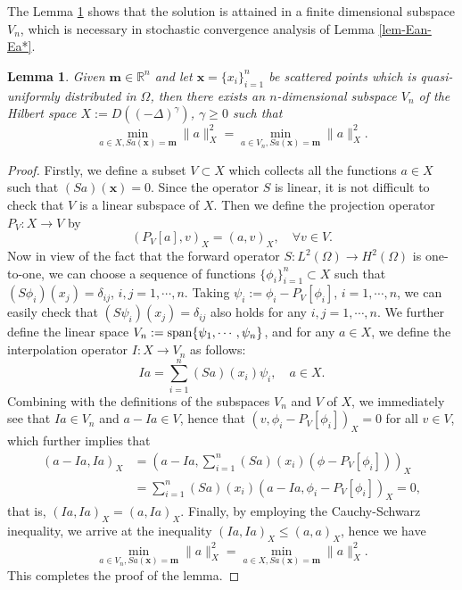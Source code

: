 \documentclass[11pt]{article}
\newtheorem{lemma}{Lemma}[section]
\numberwithin{equation}{section}
\begin{document}
The Lemma \ref{lem-Vn} shows that the solution is attained in a
finite dimensional subspace $V_n$, which is necessary in stochastic convergence analysis of Lemma \ref{lem-Ean-Ea*}.
\begin{lemma}\label{lem-Vn}
Given $\mathbf{m}\in \mathbb R^n$ and let $\mathbf{x}=\{x_i\}_{i=1}^n$ be scattered points which is quasi-uniformly distributed in $\Omega$, then there exists an $n$-dimensional subspace $V_n$ of the Hilbert space $X:=D((-\Delta)^\gamma)$, $\gamma\ge0$ such that
$$
\min_{a\in X, Sa(\mathbf{x})=\mathbf{m}} \|a\|_{X}^2 = \min_{a\in V_n, Sa(\mathbf{x})=\mathbf{m}} \|a\|_{X}^2.
$$
\end{lemma}
\begin{proof}
Firstly, we define a subset $V\subset X$ which collects all the functions $a\in X$ such that $(Sa)(\mathbf x)=0$. Since the operator $S$ is linear, it is not difficult to check that $V$ is a linear subspace of $X$. Then we define the projection operator $P_V:X\to V$ by
$$
 (P_V[a], v)_{X} = (a,v)_{X},\quad \forall v\in V.
$$
Now in view of the fact that the forward operator $S:L^2(\Omega) \to H^2(\Omega)$ is one-to-one, we can choose a sequence of functions $\{\phi_i\}_{i=1}^n\subset X$ such that $(S\phi_i)(x_j)= \delta_{ij}$, $i,j=1,\cdots,n$. Taking $\psi_i := \phi_i - P_V[\phi_i]$, $i=1,\cdots,n$, we can easily check that $(S\psi_i)(x_j)= \delta_{ij}$ also holds for any $i,j=1,\cdots,n$. We further define the linear space $V_n := {\rm span} \{\psi_1,\cdots,\psi_n\}$, and for any $a\in X$, we define the interpolation operator $I: X\to V_n$ as follows:
$$
Ia= \sum_{i=1}^n (Sa)(x_i)\psi_i,\quad a\in X.
$$
Combining with the definitions of the subspaces $V_n$ and $V$ of $X$, we immediately see that $Ia\in V_n$ and $a-Ia\in V$, hence that $(v,\phi_i - P_V[\phi_i])_{X} = 0$ for all $v\in V$, which further implies that
$$
\begin{aligned}
(a-Ia, Ia)_{X}
&= \left(a - Ia, \sum_{i=1}^n (Sa)(x_i)(\phi - P_V[\phi_i])\right)_{X} \\
&= \sum_{i=1}^n  (Sa)(x_i)(a - Ia,\phi_i - P_V[\phi_i])_{X}=0,
\end{aligned}
$$
that is, $(Ia, Ia)_{X}= (a, Ia)_{X}$. Finally, by employing the Cauchy-Schwarz inequality, we arrive at the inequality $(Ia, Ia)_{X} \le  (a, a)_{X}$, hence we have
$$
\min_{a\in V_n, Sa(\mathbf{x})=\mathbf{m}} \|a\|^2_{X} =  \min_{a\in X,Sa(\mathbf{x})=\mathbf{m}} \|a \|^2_{X}.
$$
This completes the proof of the lemma.
\end{proof}
\end{document}
